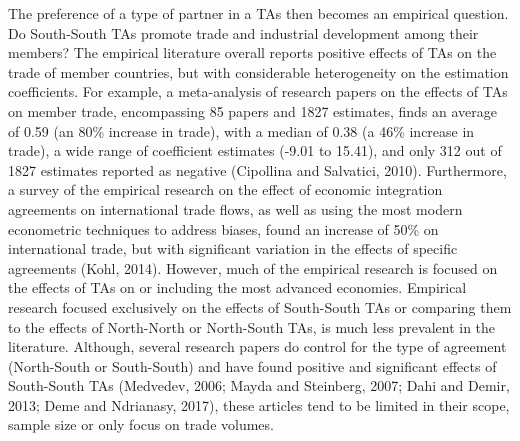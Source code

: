 The preference of a type of partner in a TAs then becomes an empirical
question. Do South-South TAs promote trade and industrial development
among their members? The empirical literature overall reports positive
effects of TAs on the trade of member countries, but with considerable
heterogeneity on the estimation coefficients. For example, a
meta-analysis of research papers on the effects of TAs on member trade,
encompassing 85 papers and 1827 estimates, finds an average of 0.59 (an
80\% increase in trade), with a median of 0.38 (a 46\% increase in
trade), a wide range of coefficient estimates (-9.01 to 15.41), and only
312 out of 1827 estimates reported as negative (Cipollina and Salvatici,
2010). Furthermore, a survey of the empirical research on the effect of
economic integration agreements on international trade flows, as well as
using the most modern econometric techniques to address biases, found an
increase of 50\% on international trade, but with significant variation
in the effects of specific agreements (Kohl, 2014). However, much of the
empirical research is focused on the effects of TAs on or including the
most advanced economies. Empirical research focused exclusively on the
effects of South-South TAs or comparing them to the effects of
North-North or North-South TAs, is much less prevalent in the
literature. Although, several research papers do control for the type of
agreement (North-South or South-South) and have found positive and
significant effects of South-South TAs (Medvedev, 2006; Mayda and
Steinberg, 2007; Dahi and Demir, 2013; Deme and Ndrianasy, 2017), these
articles tend to be limited in their scope, sample size or only focus on
trade volumes.